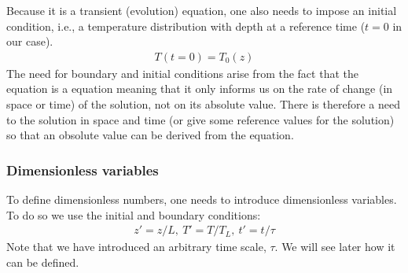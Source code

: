 \documentclass[letterpaper,10pt,english]{jupyterBook}
\begin{document}
\sphinxAtStartPar
Because it is a transient (evolution) equation, one also needs to impose an initial condition, i.e., a temperature distribution with depth at a reference time (\(t=0\) in our case).
\begin{equation*}
\begin{split}T(t=0)=T_0(z)\end{split}
\end{equation*}
\sphinxAtStartPar
The need for boundary and initial conditions arise from the fact that the equation is a  equation meaning that it only informs us on the rate of change (in space or time) of the solution, not on its absolute value. There is therefore a need to  the solution in space and time (or give some reference values for the solution) so that an obsolute value can be derived from the equation.


\subsubsection{Dimensionless variables}
\label{\detokenize{diffusion-advection:dimensionless-variables}}
\sphinxAtStartPar
To define dimensionless numbers, one needs to introduce dimensionless variables. To do so we use the initial and boundary conditions:
\begin{equation*}
\begin{split}z'=z/L,\ T'=T/T_L,\ t'=t/\tau\end{split}
\end{equation*}
\sphinxAtStartPar
Note that we have introduced an arbitrary time scale, \(\tau\). We will see later how it can be defined.
\end{document}
